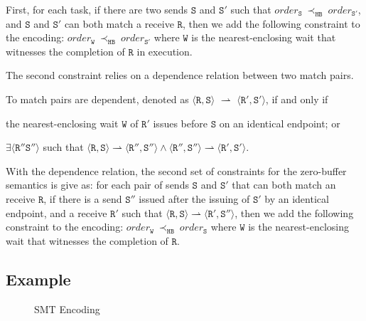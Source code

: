 First, for each task, if there are two sends $\mathtt{S}$ and
$\mathtt{S'}$ such that
$\mathit{order}_\mathtt{S}\ \mathrm{\prec_\mathtt{HB}}\ \mathit{order}_\mathtt{S'}$,
and $\mathtt{S}$ and $\mathtt{S'}$ can both match a receive
$\mathtt{R}$, then we add the following constraint to the encoding:
$\mathit{order}_{\mathtt{W}}\ \mathrm{\prec_{\mathtt{HB}}}\ \mathit{order}_{\mathtt{S'}}$
where $\mathtt{W}$ is the nearest-enclosing wait that witnesses the
completion of $\mathtt{R}$ in execution.

The second constraint relies on a dependence relation between two match pairs.
\begin{definition}
To match pairs are dependent, denoted as $\langle\mathtt{R}, \mathtt{S}\rangle$ $\rightharpoonup$ $\langle\mathtt{R'}, \mathtt{S'}\rangle$, if and only if
\begin{compactenum}
\item the nearest-enclosing wait $\mathtt{W}$ of $\mathtt{R'}$ issues before $\mathtt{S}$ on an identical endpoint; or
\item $\exists\langle\mathtt{R''} \mathtt{S''}\rangle$ such that $\langle\mathtt{R}, \mathtt{S}\rangle \rightharpoonup \langle\mathtt{R''}, \mathtt{S''}\rangle\wedge\langle\mathtt{R''}, \mathtt{S''}\rangle \rightharpoonup \langle\mathtt{R'}, \mathtt{S'}\rangle$.
\end{compactenum}
\label{def:matchrelation}
\end{definition}
With the dependence relation, the second set of constraints for the zero-buffer semantics is give as: for each pair of sends $\mathtt{S}$ and $\mathtt{S'}$ that can both match an receive $\mathtt{R}$, if there is a send $\mathtt{S''}$ issued after the issuing of $\mathtt{S'}$ by an identical endpoint, and a receive $\mathtt{R'}$ such that $\langle\mathtt{R}, \mathtt{S}\rangle\rightharpoonup\langle\mathtt{R'}, \mathtt{S''}\rangle$, then we add the following constraint to the encoding: $\mathit{order}_{\mathtt{W}}\ \mathrm{\prec_{\mathtt{HB}}}\ \mathit{order}_{\mathtt{S}}$
where $\mathtt{W}$ is the nearest-enclosing wait that witnesses the
completion of $\mathtt{R}$.


\subsection{Example}

\begin{figure}[t]
\begin{center}
\usebox{\boxSMTc}
\end{center}
\caption{SMT Encoding} \label{fig:smt-encode}
\end{figure}

